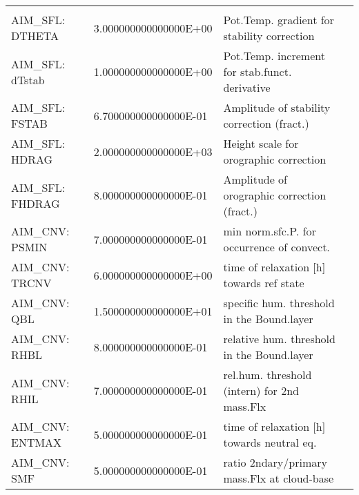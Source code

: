 \begin{table}
\begin{tabular}{lllc}
    &  %
    \\
   AIM\_SFL: DTHETA   &                   3.000000000000000E+00
    &   Pot.Temp. gradient for stability correction 
    &  %
    \\
   AIM\_SFL: dTstab   &                   1.000000000000000E+00
    &   Pot.Temp. increment for stab.funct. derivative 
    &  %
    \\
   AIM\_SFL:  FSTAB   &                   6.700000000000000E-01
    &   Amplitude of stability correction (fract.) 
    &  %
    \\
   AIM\_SFL:  HDRAG   &                   2.000000000000000E+03
    &   Height scale for orographic correction 
    &  %
    \\
   AIM\_SFL: FHDRAG   &                   8.000000000000000E-01
    &   Amplitude of orographic correction (fract.)
    &  %
    \\
   AIM\_CNV:  PSMIN   &                   7.000000000000000E-01
    &   min norm.sfc.P. for occurrence of convect. 
    &  %
    \\
   AIM\_CNV:  TRCNV   &                   6.000000000000000E+00
    &   time of relaxation [h] towards ref state 
    &  %
    \\
   AIM\_CNV:    QBL   &                   1.500000000000000E+01
    &   specific hum. threshold in the Bound.layer 
    &  %
    \\
   AIM\_CNV:   RHBL   &                   8.000000000000000E-01
    &   relative hum. threshold in the Bound.layer 
    &  %
    \\
   AIM\_CNV:   RHIL   &                   7.000000000000000E-01
    &   rel.hum. threshold (intern) for 2nd mass.Flx
    &  %
    \\
   AIM\_CNV: ENTMAX   &                   5.000000000000000E-01
    &   time of relaxation [h] towards neutral eq. 
    &  %
    \\
   AIM\_CNV:    SMF   &                   5.000000000000000E-01
    &   ratio 2ndary/primary mass.Flx at cloud-base
    &  %
    \\
\end{tabular}
\end{table}

